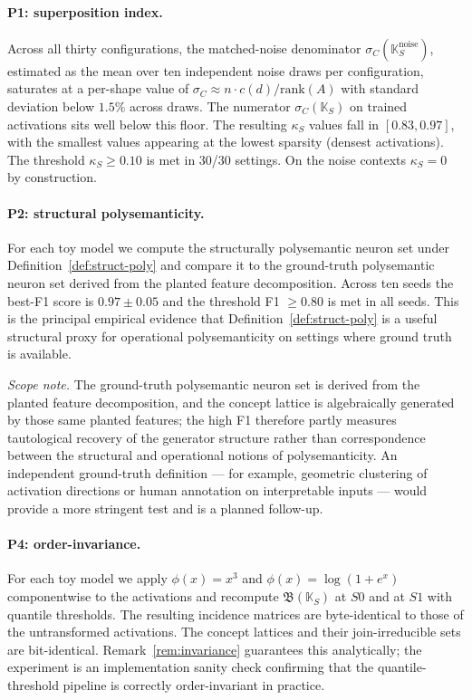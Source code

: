 \documentclass[a4paper,fleqn]{cas-dc}
\newcommand{\K}{\mathbb{K}}
\newcommand{\Lat}{\mathfrak{B}}
\newcommand{\sigC}{\sigma_C}
\newcommand{\kS}{\kappa_S}
\begin{document}
\paragraph{P1: superposition index.}
Across all thirty configurations, the matched-noise denominator $\sigC(\K_S^{\mathrm{noise}})$, estimated as the mean over ten independent noise draws per configuration, saturates at a per-shape value of $\sigC \approx n \cdot c(d) / \mathrm{rank}(A)$ with standard deviation below $1.5\%$ across draws.
The numerator $\sigC(\K_S)$ on trained activations sits well below this floor.
The resulting $\kS$ values fall in $[0.83, 0.97]$, with the smallest values appearing at the lowest sparsity (densest activations).
The threshold $\kS \ge 0.10$ is met in 30/30 settings.
On the noise contexts $\kS = 0$ by construction.

\paragraph{P2: structural polysemanticity.}
For each toy model we compute the structurally polysemantic neuron set under Definition~\ref{def:struct-poly} and compare it to the ground-truth polysemantic neuron set derived from the planted feature decomposition.
Across ten seeds the best-F1 score is $0.97 \pm 0.05$ and the threshold F1 $\ge 0.80$ is met in all seeds.
This is the principal empirical evidence that Definition~\ref{def:struct-poly} is a useful structural proxy for operational polysemanticity on settings where ground truth is available.

\noindent\textit{Scope note.}
The ground-truth polysemantic neuron set is derived from the planted feature decomposition, and the concept lattice is algebraically generated by those same planted features; the high F1 therefore partly measures tautological recovery of the generator structure rather than correspondence between the structural and operational notions of polysemanticity.
An independent ground-truth definition --- for example, geometric clustering of activation directions or human annotation on interpretable inputs --- would provide a more stringent test and is a planned follow-up.

\paragraph{P4: order-invariance.}
For each toy model we apply $\phi(x) = x^3$ and $\phi(x) = \log(1 + e^x)$ componentwise to the activations and recompute $\Lat(\K_{S})$ at $S0$ and at $S1$ with quantile thresholds.
The resulting incidence matrices are byte-identical to those of the untransformed activations.
The concept lattices and their join-irreducible sets are bit-identical.
Remark~\ref{rem:invariance} guarantees this analytically; the experiment is an implementation sanity check confirming that the quantile-threshold pipeline is correctly order-invariant in practice.
\end{document}
